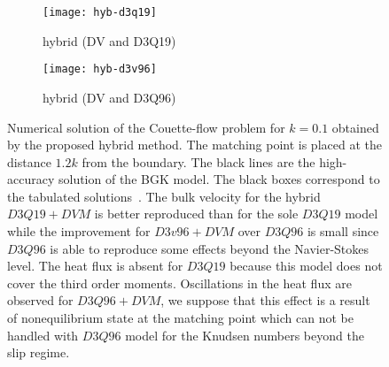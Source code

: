 \documentclass[]{elsarticle} %
\begin{document}
\begin{figure}
    \centering
    \begin{subfigure}[b]{0.5\textwidth}
        \texttt{[image: hyb-d3q19]}
        \caption{hybrid (DV and D3Q19)}
        \label{fig:hyb:d3q19}
    \end{subfigure}%
    \begin{subfigure}[b]{0.5\textwidth}
        \texttt{[image: hyb-d3v96]}
        \caption{hybrid (DV and D3Q96)}
        \label{fig:hyb:d3v96}
    \end{subfigure}
    \caption{
        Numerical solution of the Couette-flow problem for $k=0.1$ obtained by the proposed hybrid method.
 The matching point is placed  at the  distance $1.2 k$ from the  boundary.
The black lines are the high-accuracy solution of the BGK model. The black boxes correspond to the tabulated solutions~\cite{Luo2015, Luo2016}. The bulk velocity for the hybrid $D3Q19+DVM$ is  better reproduced than for the sole $D3Q19$ model while  the  improvement for $D3v96+DVM$ over $D3Q96$ is  small since  $D3Q96$  is able  to reproduce some effects beyond  the Navier-Stokes level. The heat flux is absent  for $D3Q19$ because  this  model does not cover  the  third order moments. Oscillations  in the  heat flux are  observed for  $D3Q96+DVM$, we suppose  that this  effect is a result  of nonequilibrium state at the  matching  point which can not  be  handled with $D3Q96$  model for the  Knudsen numbers beyond  the slip regime.
    }\label{fig:hybrid}
\end{figure}
\end{document}
